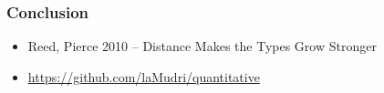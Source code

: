 \documentclass{beamer}
\begin{document}
  \begin{frame}
    \frametitle{Conclusion}
    \begin{itemize}
    \item Reed, Pierce 2010 -- Distance Makes the Types Grow Stronger
    \item \url{https://github.com/laMudri/quantitative}
    \end{itemize}
  \end{frame}
\end{document}
